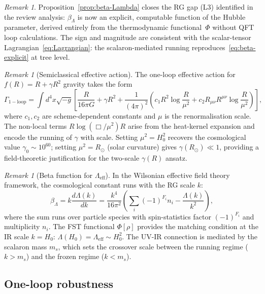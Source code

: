 \documentclass[12pt,a4paper]{article}
\theoremstyle{definition}
\theoremstyle{plain}
\theoremstyle{remark}
\newtheorem{remark}[definition]{Remark}
\begin{document}
\begin{remark}
Proposition~\ref{prop:beta-Lambda} closes the RG gap (L3) identified
in the review analysis: $\beta_\Lambda$ is now an explicit,
computable function of the Hubble parameter, derived entirely from
the thermodynamic functional~$\Phi$ without QFT loop calculations.
The sign and magnitude are consistent with the scalar-tensor
Lagrangian~\eqref{eq:Lagrangian}: the scalaron-mediated running
reproduces~\eqref{eq:beta-explicit} at tree level.
\end{remark}

\begin{remark}[Semiclassical effective action]
\label{rem:semiclassical}
The one-loop effective action for $f(R) = R + \gamma R^2$ gravity takes the form
\[
\Gamma_{\mathrm{1-loop}} = \int d^4x \sqrt{-g} \left[ \frac{R}{16\pi G} + \gamma R^2 + \frac{1}{(4\pi)^2} \left( c_1 R^2 \log\frac{R}{\mu^2} + c_2 R_{\mu\nu} R^{\mu\nu} \log\frac{R}{\mu^2} \right) \right],
\]
where $c_1, c_2$ are scheme-dependent constants and $\mu$ is the renormalisation scale. The non-local terms $R \log(\Box/\mu^2) R$ arise from the heat-kernel expansion and encode the running of $\gamma$ with scale. Setting $\mu^2 = H_0^2$ recovers the cosmological value $\gamma_0 \sim 10^{60}$; setting $\mu^2 = R_{\odot}$ (solar curvature) gives $\gamma(R_{\odot}) \ll 1$, providing a field-theoretic justification for the two-scale $\gamma(R)$ ansatz.
\end{remark}

\begin{remark}[Beta function for $\Lambda_{\mathrm{eff}}$]
\label{rem:beta-lambda}
In the Wilsonian effective field theory framework, the cosmological constant runs with the RG scale $k$:
\[
\beta_\Lambda = k \frac{d\Lambda(k)}{dk} = \frac{k^4}{16\pi^2} \left( \sum_i (-1)^{F_i} n_i - \frac{\Lambda(k)}{k^2} \right),
\]
where the sum runs over particle species with spin-statistics factor $(-1)^{F_i}$ and multiplicity $n_i$. The FST functional $\Phi[\rho]$ provides the matching condition at the IR scale $k = H_0$: $\Lambda(H_0) = \Lambda_{\mathrm{eff}} \sim H_0^2$. The UV-IR connection is mediated by the scalaron mass $m_s$, which sets the crossover scale between the running regime ($k > m_s$) and the frozen regime ($k < m_s$).
\end{remark}

\subsection{One-loop robustness}\label{sec:one-loop}
\end{document}
